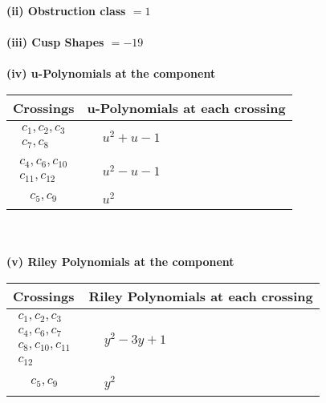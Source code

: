 \documentclass[1p]{elsarticle_modified}
\theoremstyle{definition}
\begin{document}
\flushleft \textbf{(ii) Obstruction class $= 1$}\\~\\
\flushleft \textbf{(iii) Cusp Shapes $= -19$}\\~\\
\newpage\renewcommand{\arraystretch}{1}
\flushleft \textbf{(iv) u-Polynomials at the component}\newline \\
\begin{tabular}{m{50pt}|m{274pt}}
Crossings & \hspace{64pt}u-Polynomials at each crossing \\
\hline $$\begin{aligned}c_{1},c_{2},c_{3}\\c_{7},c_{8}\end{aligned}$$&$\begin{aligned}
&u^2+u-1
\end{aligned}$\\
\hline $$\begin{aligned}c_{4},c_{6},c_{10}\\c_{11},c_{12}\end{aligned}$$&$\begin{aligned}
&u^2- u-1
\end{aligned}$\\
\hline $$\begin{aligned}c_{5},c_{9}\end{aligned}$$&$\begin{aligned}
&u^2
\end{aligned}$\\
\hline
\end{tabular}\\~\\
\newpage\renewcommand{\arraystretch}{1}
\flushleft \textbf{(v) Riley Polynomials at the component}\newline \\
\begin{tabular}{m{50pt}|m{274pt}}
Crossings & \hspace{64pt}Riley Polynomials at each crossing \\
\hline $$\begin{aligned}c_{1},c_{2},c_{3}\\c_{4},c_{6},c_{7}\\c_{8},c_{10},c_{11}\\c_{12}\end{aligned}$$&$\begin{aligned}
&y^2-3 y+1
\end{aligned}$\\
\hline $$\begin{aligned}c_{5},c_{9}\end{aligned}$$&$\begin{aligned}
&y^2
\end{aligned}$\\
\hline
\end{tabular}\\~\\
\end{document}
